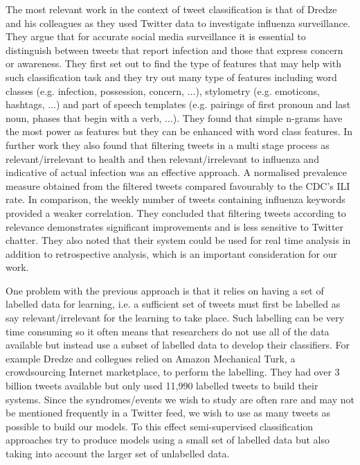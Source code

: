 \documentclass[10pt,letterpaper]{article}
\begin{document}
The most relevant work in the context of tweet classification is that of Dredze and his colleagues \cite{REF78,REF18} as they used Twitter data to investigate influenza surveillance.  They argue that for accurate social media surveillance it is essential to distinguish between tweets that report infection and those that express concern or awareness.  They first set out to find the type of features that may help with such classification task \cite{REF78} and they try out many type of features including word classes (e.g. infection, possession, concern, $\ldots$), stylometry (e.g. emoticons, hashtags, $\ldots$) and part of speech templates (e.g. pairings of first pronoun and last noun, phases that begin with a verb, $\ldots$). They found that simple n-grams have the most power as features but they can be enhanced with word class features.  In further work \cite{REF18} they also found that filtering tweets in a multi stage process as relevant/irrelevant to health and then relevant/irrelevant to influenza and indicative of actual infection was an effective approach.  A normalised prevalence measure obtained from the filtered tweets compared favourably to the CDC's ILI rate.  In comparison, the weekly number of tweets containing influenza keywords provided a weaker correlation.  They concluded that filtering tweets according to relevance demonstrates significant improvements and is less sensitive to Twitter chatter.  They also noted that their system could be used for real time analysis in addition to retrospective analysis, which is an important consideration for our work.  

One problem with the previous approach is that it relies on having a set of labelled data for learning, i.e. a sufficient set of tweets must first be labelled as say relevant/irrelevant for the learning to take place.  Such labelling can be very time consuming so it often means that researchers do not use all of the data available but instead use a subset of labelled data to develop their classifiers. For example Dredze and collegues  \cite{REF78,REF18} relied on Amazon Mechanical Turk, a crowdsourcing Internet marketplace, to perform the labelling. They had over 3 billion tweets available but only used 11,990 labelled tweets to build their systems.   Since the syndromes/events we wish to study are often rare and may not be mentioned frequently in a Twitter feed, we wish to use as many tweets as possible to build our models.  To this effect semi-supervised classification approaches try to produce models using a small set of labelled data but also taking into account the larger set of unlabelled data.  
\end{document}
